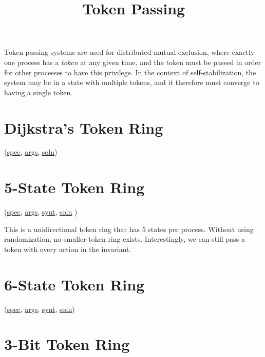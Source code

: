 
\title{Token Passing}
\date{}




Token passing systems are used for distributed mutual exclusion, where exactly one process has a \textit{token} at any given time, and the token must be passed in order for other processes to have this privilege.
In the context of self-stabilization, the system may be in a state with multiple tokens, and it therefore must converge to having a single token.

\tableofcontents

\section{Dijkstra's Token Ring}
\label{sec:TokenRingDijkstra}

(\href{\examplespec/TokenRingDijkstra.prot}{spec},
\href{\examplesett/TokenRingDijkstra.prot}{args},
\href{\examplesoln/TokenRingDijkstra.prot}{soln})

\section{5-State Token Ring}
\label{sec:TokenRingFiveState}

(\href{\examplespec/TokenRing.prot}{spec},
\href{\examplesett/TokenRingFiveState.args}{args},
\href{\examplesynt/TokenRingFiveState.prot}{synt},
\href{\examplesoln/TokenRingFiveState.prot}{soln} )

This is a unidirectional token ring that has 5 states per process.
Without using randomization, no smaller token ring exists.
Interestingly, we can still pass a token with every action in the invariant.

\section{6-State Token Ring}
\label{sec:TokenRingSixState}

(\href{\examplespec/TokenRingSuperpos.prot}{spec},
\href{\examplesett/TokenRingSixState.args}{args},
\href{\examplesynt/TokenRingSuperpos.prot}{synt},
\href{\examplesoln/TokenRingSixState.prot}{soln})

\section{3-Bit Token Ring}
\label{sec:TokenRingThreeBit}

